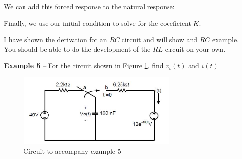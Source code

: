 \documentclass{handout}
\begin{document}
We can add this forced response to the natural response:
\soln{1in}{
\[
v(t) = Ke^{-\frac{t}{RC}}+\frac{ V_A}{ \left[1-RC\alpha\right]}e^{-\alpha t}
\]
}

Finally, we use our initial condition to solve for the coeeficient $K$.

I have shown the derivation for an $RC$ circuit and will show and $RC$ example.  You should be able to do the development of the $RL$ circuit on your own.

\newpage
\clearpage
\pagebreak

\textbf{Example 5} -- For the circuit shown in Figure \ref{fig: Example5}, find $v_c(t)$ and $i(t)$

\begin{figure} [h!]
\centering
\includegraphics[width=0.7\textwidth]{Example5.jpg}
\caption{Circuit to accompany example 5}
\label{fig: Example5}
\end{figure}

\end{document}
